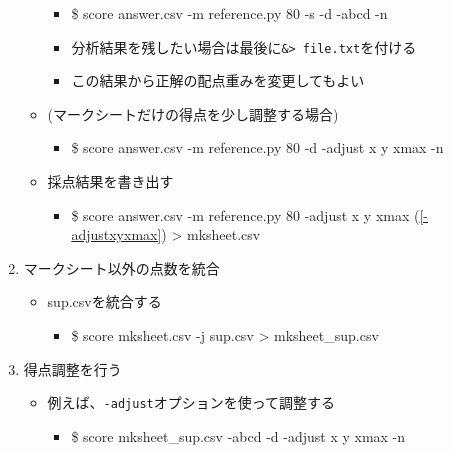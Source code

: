 \begin{enumerate}
\begin{itemize}
\begin{itemize}
\item \$ score answer.csv -m reference.py 80 -s -d -abcd -n

\item 分析結果を残したい場合は最後に\texttt{\&> file.txt}を付ける

\item この結果から正解の配点重みを変更してもよい

\end{itemize}

\item (マークシートだけの得点を少し調整する場合)

\begin{itemize}
\item \$ score answer.csv -m reference.py 80 -d -adjust x y xmax -n

\end{itemize}

\item 採点結果を書き出す

\begin{itemize}
\item \$ score answer.csv -m reference.py 80 -adjust x y xmax (\autoref{-adjustxyxmax}) > mksheet.csv

\end{itemize}

\end{itemize}

\item マークシート以外の点数を統合

\begin{itemize}
\item sup.csvを統合する

\begin{itemize}
\item \$ score mksheet.csv -j sup.csv > mksheet\_sup.csv

\end{itemize}

\end{itemize}

\item 得点調整を行う

\begin{itemize}
\item 例えば、\texttt{-adjust}オプションを使って調整する

\begin{itemize}
\item \$ score mksheet\_sup.csv -abcd -d -adjust x y xmax -n


\end{itemize}
\end{itemize}
\end{enumerate}
